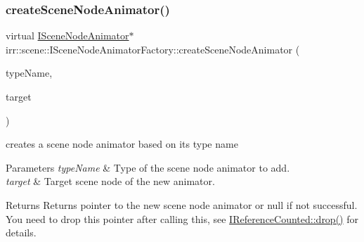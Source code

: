\subsubsection{\texorpdfstring{create\+Scene\+Node\+Animator()}{createSceneNodeAnimator()}\hspace{0.1cm}{\footnotesize\ttfamily [2/2]}}
{\footnotesize\ttfamily virtual \hyperlink{classirr_1_1scene_1_1ISceneNodeAnimator}{I\+Scene\+Node\+Animator}$\ast$ irr\+::scene\+::\+I\+Scene\+Node\+Animator\+Factory\+::create\+Scene\+Node\+Animator (\begin{DoxyParamCaption}\item[{const \hyperlink{namespaceirr_a9395eaea339bcb546b319e9c96bf7410}{c8} $\ast$}]{type\+Name,  }\item[{\hyperlink{classirr_1_1scene_1_1ISceneNode}{I\+Scene\+Node} $\ast$}]{target }\end{DoxyParamCaption})\hspace{0.3cm}{\ttfamily [pure virtual]}}



creates a scene node animator based on its type name 


\begin{DoxyParams}{Parameters}
{\em type\+Name} & Type of the scene node animator to add. \\
\hline
{\em target} & Target scene node of the new animator. \\
\hline
\end{DoxyParams}
\begin{DoxyReturn}{Returns}
Returns pointer to the new scene node animator or null if not successful. You need to drop this pointer after calling this, see \hyperlink{classirr_1_1IReferenceCounted_a03856a09355b89d178090c4a5f738543}{I\+Reference\+Counted\+::drop()} for details. 
\end{DoxyReturn}
\mbox{\label{classirr_1_1scene_1_1ISceneNodeAnimatorFactory_a6b423730b46154f5e0c3bcfd21e41755}} 
